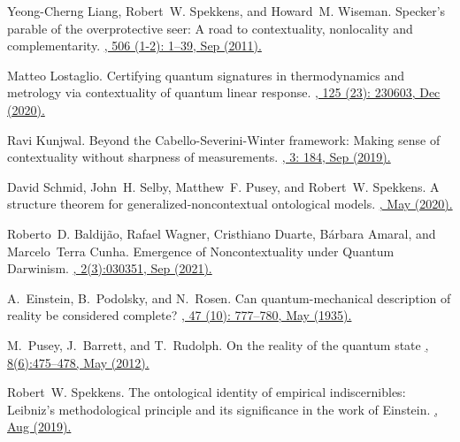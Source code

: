 \documentclass[letterpaper,onecolumn,12pt,accepted=2024-01-17]{article}
\begin{document}
\begin{thebibliography}{100}
Yeong-Cherng Liang, Robert~W. Spekkens, and Howard~M. Wiseman.
\newblock Specker’s parable of the overprotective seer: {A} road to contextuality, nonlocality and complementarity.
\href{https://doi.org/10.1016/j.physrep.2011.05.001}{, 506 (1-2): 1--39, Sep (2011).}

Matteo Lostaglio.
\newblock Certifying quantum signatures in thermodynamics and metrology via
  contextuality of quantum linear response.
\href{https://doi.org/10.1103/PhysRevLett.125.230603}{, 125 (23): 230603, Dec (2020).}

Ravi Kunjwal.
\newblock Beyond the {C}abello-{S}everini-{W}inter framework: {M}aking sense of contextuality without sharpness of measurements.
\href{https://doi.org/10.22331/q-2019-09-09-184}{, 3: 184, Sep (2019).}

David Schmid, John~H. Selby, Matthew~F. Pusey, and Robert~W. Spekkens.
\newblock A structure theorem for generalized-noncontextual ontological models.
\href{https://doi.org/10.48550/arXiv.2005.07161}{, May (2020).}

Roberto~D. Baldijão, Rafael Wagner, Cristhiano Duarte, Bárbara Amaral, and Marcelo~Terra Cunha.
\newblock Emergence of {N}oncontextuality under {Q}uantum {D}arwinism.
\href{https://doi.org/10.1103/PRXQuantum.2.030351}{, 2(3):030351, Sep (2021).}

A.~Einstein, B.~Podolsky, and N.~Rosen.
\newblock Can quantum-mechanical description of reality be considered complete?
\href{https://doi.org/10.1103/PhysRev.47.777}{, 47 (10): 777--780, May (1935).}

M.~Pusey, J.~Barrett, and T.~Rudolph.
\newblock On the reality of the quantum state
\href{https://doi.org/10.1038/nphys2309}{, 8(6):475--478, May (2012).}

Robert~W. Spekkens.
\newblock The ontological identity of empirical indiscernibles: {L}eibniz's
  methodological principle and its significance in the work of {E}instein.
\href{https://doi.org/10.48550/arXiv.1909.04628}{, Aug (2019).}


\end{thebibliography}
\end{document}
